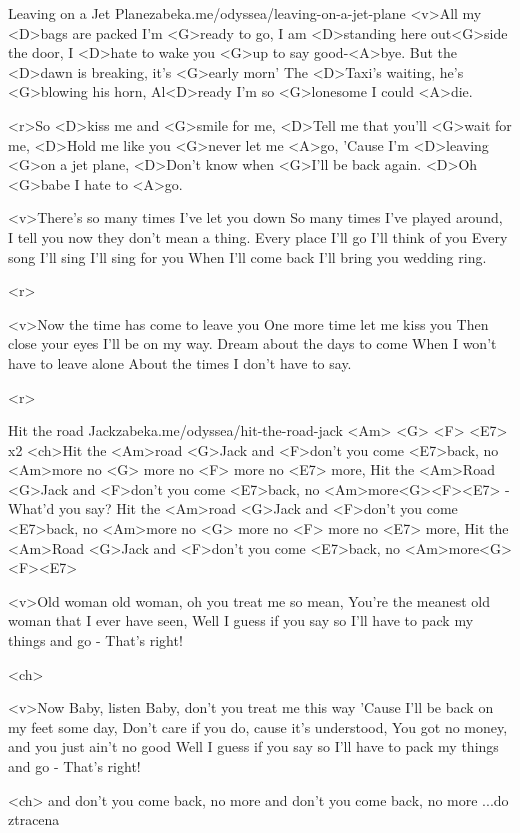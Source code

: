\begin{song}{54}{Leaving on a Jet Plane}{zabeka.me/odyssea/leaving-on-a-jet-plane}
	<v>All my <D>bags are packed I'm <G>ready to go,
	I am <D>standing here out<G>side the door,
	I <D>hate to wake you <G>up to say good-<A>bye.
	But the <D>dawn is breaking, it's <G>early morn'
	The <D>Taxi's waiting, he's <G>blowing his horn,
	Al<D>ready I'm so <G>lonesome I could <A>die.

	<r>So <D>kiss me and <G>smile for me,
	<D>Tell me that you'll <G>wait for me,
	<D>Hold me like you <G>never let me <A>go,
	'Cause I'm <D>leaving <G>on a jet plane,
	<D>Don't know when <G>I'll be back again.
	<D>Oh <G>babe I hate to <A>go.

	<v>There's so many times I've let you down
	So many times I've played around,
	I tell you now they don't mean a thing.
	Every place I'll go I'll think of you
	Every song I'll sing I'll sing for you
	When I'll come back I'll bring you wedding ring.

	<r>

	<v>Now the time has come to leave you
	One more time let me kiss you
	Then close your eyes I'll be on my way.
	Dream about the days to come
	When I won't have to leave alone
	About the times I don't have to say.

	<r>
\end{song}
\begin{song}{55}{Hit the road Jack}{zabeka.me/odyssea/hit-the-road-jack}
	<Am> <G> <F> <E7> x2
	<ch>Hit the <Am>road <G>Jack and <F>don't you come <E7>back,
	no <Am>more no <G> more no <F> more no <E7> more,
	Hit the <Am>Road <G>Jack and <F>don't you come <E7>back,
	no <Am>more<G><F><E7> - What'd you say?
	Hit the <Am>road <G>Jack and <F>don't you come <E7>back,
	no <Am>more no <G> more no <F> more no <E7> more,
	Hit the <Am>Road <G>Jack and <F>don't you come <E7>back,
	no <Am>more<G><F><E7>

	<v>Old woman old woman, oh you treat me so mean,
	You're the meanest old woman that I ever have seen,
	Well I guess if you say so
	I'll have to pack my things and go - That's right!

	<ch>

	<v>Now Baby, listen Baby, don't you treat me this way
	'Cause I'll be back on my feet some day,
	Don't care if you do, cause it's understood,
	You got no money, and you just ain't no good
	Well I guess if you say so
	I'll have to pack my things and go - That's right!

	<ch>
	and don't you come back, no more
	and don't you come back, no more ...do ztracena
\end{song}
